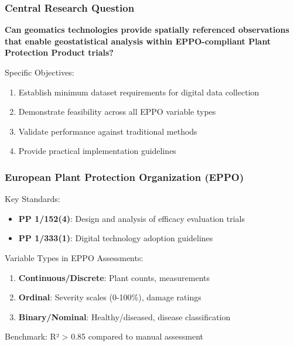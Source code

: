 \documentclass[aspectratio=43]{beamer}
\begin{document}
\begin{frame}
    \frametitle{Central Research Question}
    
    \begin{exampleblock}{}
        \large
        \textbf{Can geomatics technologies provide spatially referenced observations that enable geostatistical analysis within EPPO-compliant Plant Protection Product trials?}
    \end{exampleblock}
    
    \vspace{1em}
    
    \begin{block}{Specific Objectives:}
        \begin{enumerate}
            \item Establish minimum dataset requirements for digital data collection
            \item Demonstrate feasibility across all EPPO variable types
            \item Validate performance against traditional methods
            \item Provide practical implementation guidelines
        \end{enumerate}
    \end{block}
\end{frame}

\begin{frame}
    \frametitle{European Plant Protection Organization (EPPO)}
    
    \begin{block}{Key Standards:}
        \begin{itemize}
            \item \textbf{PP 1/152(4)}: Design and analysis of efficacy evaluation trials
            \item \textbf{PP 1/333(1)}: Digital technology adoption guidelines
        \end{itemize}
    \end{block}
    
    \begin{block}{Variable Types in EPPO Assessments:}
        \begin{enumerate}
            \item \textbf{Continuous/Discrete}: Plant counts, measurements
            \item \textbf{Ordinal}: Severity scales (0-100\%), damage ratings
            \item \textbf{Binary/Nominal}: Healthy/diseased, disease classification
        \end{enumerate}
    \end{block}
    
    \begin{alertblock}{Benchmark: R² > 0.85 compared to manual assessment}
    \end{alertblock}
\end{frame}
\end{document}

